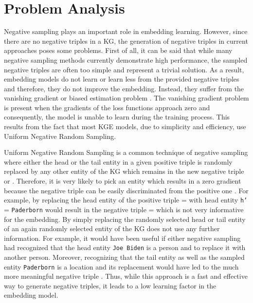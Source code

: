 \section{Problem Analysis}
\label{sec:problem_analysis}

Negative sampling plays an important role in embedding learning.
However, since there are no negative triples in a \ac{KG}, the generation of negative triples in current approaches poses some problems.
First of all, it can be said that while many negative sampling methods currently demonstrate high performance, the sampled negative triples are often too simple and represent a trivial solution. 
As a result, embedding models do not learn or learn less from the provided negative triples and therefore, they do not improve the embedding.
Instead, they suffer from the vanishing gradient or biased estimation problem \cite{zhang2021efficient}.
The vanishing gradient problem is present when the gradients of the loss functions approach zero and consequently, the model is unable to learn during the training process.
This results from the fact that most \ac{KGE} models, due to simplicity and efficiency, use Uniform Negative Random Sampling.

Uniform Negative Random Sampling is a common technique of negative sampling where either the head or the tail entity in a given positive triple  is randomly replaced by any other entity of the \ac{KG} which remains in the new negative triple  or . 
Therefore, it is very likely to pick an entity which results in a zero gradient because the negative triple can be easily discriminated from the positive one \cite{cai2017kbgan}.
For example, by replacing the head entity of the positive triple  =  with head entity \texttt{h'} = \texttt{Paderborn} would result in the negative triple  =   which is not very informative for the embedding.
By simply replacing the randomly selected head or tail entity of an again randomly selected entity of the \ac{KG} does not use any further information.
For example, it would have been useful if either negative sampling had recognized that the head entity \texttt{Joe Biden} is a person and to replace it with another person.
Moreover, recognizing that the tail entity as well as the sampled entity \texttt{Paderborn} is a location and its replacement would have led to the much more meaningful negative triple .  
Thus, while this approach is a fast and effective way to generate negative triples, it leads to a low learning factor in the embedding model.

